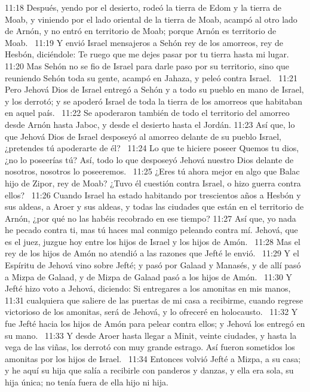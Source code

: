 11:18 Después, yendo por el desierto, rodeó la tierra de Edom y la tierra de Moab, y viniendo por el lado oriental de la tierra de Moab, acampó al otro lado de Arnón, y no entró en territorio de Moab; porque Arnón es territorio de Moab.  
11:19 Y envió Israel mensajeros a Sehón rey de los amorreos, rey de Hesbón, diciéndole: Te ruego que me dejes pasar por tu tierra hasta mi lugar.  
11:20 Mas Sehón no se fio de Israel para darle paso por su territorio, sino que reuniendo Sehón toda su gente, acampó en Jahaza, y peleó contra Israel.  
11:21 Pero Jehová Dios de Israel entregó a Sehón y a todo su pueblo en mano de Israel, y los derrotó; y se apoderó Israel de toda la tierra de los amorreos que habitaban en aquel país.  
11:22 Se apoderaron también de todo el territorio del amorreo desde Arnón hasta Jaboc, y desde el desierto hasta el Jordán. 
11:23 Así que, lo que Jehová Dios de Israel desposeyó al amorreo delante de su pueblo Israel, ¿pretendes tú apoderarte de él?  
11:24 Lo que te hiciere poseer Quemos tu dios, ¿no lo poseerías tú? Así, todo lo que desposeyó Jehová nuestro Dios delante de nosotros, nosotros lo poseeremos.  
11:25 ¿Eres tú ahora mejor en algo que Balac hijo de Zipor, rey de Moab? ¿Tuvo él cuestión contra Israel, o hizo guerra contra ellos?  
11:26 Cuando Israel ha estado habitando por trescientos años a Hesbón y sus aldeas, a Aroer y sus aldeas, y todas las ciudades que están en el territorio de Arnón, ¿por qué no las habéis recobrado en ese tiempo? 
11:27 Así que, yo nada he pecado contra ti, mas tú haces mal conmigo peleando contra mí. Jehová, que es el juez, juzgue hoy entre los hijos de Israel y los hijos de Amón.  
11:28 Mas el rey de los hijos de Amón no atendió a las razones que Jefté le envió.  
11:29 Y el Espíritu de Jehová vino sobre Jefté; y pasó por Galaad y Manasés, y de allí pasó a Mizpa de Galaad, y de Mizpa de Galaad pasó a los hijos de Amón.  
11:30 Y Jefté hizo voto a Jehová, diciendo: Si entregares a los amonitas en mis manos,  
11:31 cualquiera que saliere de las puertas de mi casa a recibirme, cuando regrese victorioso de los amonitas, será de Jehová, y lo ofreceré en holocausto.  
11:32 Y fue Jefté hacia los hijos de Amón para pelear contra ellos; y Jehová los entregó en su mano.  
11:33 Y desde Aroer hasta llegar a Minit, veinte ciudades, y hasta la vega de las viñas, los derrotó con muy grande estrago. Así fueron sometidos los amonitas por los hijos de Israel.  
11:34 Entonces volvió Jefté a Mizpa, a su casa; y he aquí su hija que salía a recibirle con panderos y danzas, y ella era sola, su hija única; no tenía fuera de ella hijo ni hija.  
